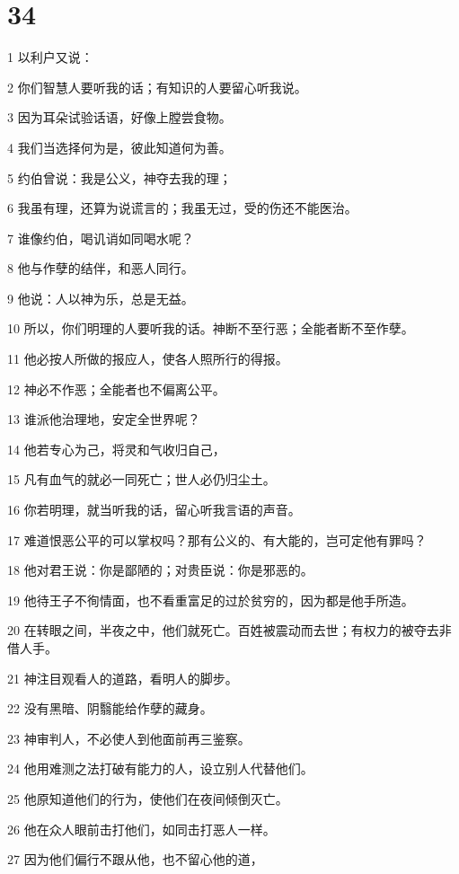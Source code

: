 \chapter{34}

\par 1 以利户又说：
\par 2 你们智慧人要听我的话；有知识的人要留心听我说。
\par 3 因为耳朵试验话语，好像上膛尝食物。
\par 4 我们当选择何为是，彼此知道何为善。
\par 5 约伯曾说：我是公义，神夺去我的理；
\par 6 我虽有理，还算为说谎言的；我虽无过，受的伤还不能医治。
\par 7 谁像约伯，喝讥诮如同喝水呢？
\par 8 他与作孽的结伴，和恶人同行。
\par 9 他说：人以神为乐，总是无益。
\par 10 所以，你们明理的人要听我的话。神断不至行恶；全能者断不至作孽。
\par 11 他必按人所做的报应人，使各人照所行的得报。
\par 12 神必不作恶；全能者也不偏离公平。
\par 13 谁派他治理地，安定全世界呢？
\par 14 他若专心为己，将灵和气收归自己，
\par 15 凡有血气的就必一同死亡；世人必仍归尘土。
\par 16 你若明理，就当听我的话，留心听我言语的声音。
\par 17 难道恨恶公平的可以掌权吗？那有公义的、有大能的，岂可定他有罪吗？
\par 18 他对君王说：你是鄙陋的；对贵臣说：你是邪恶的。
\par 19 他待王子不徇情面，也不看重富足的过於贫穷的，因为都是他手所造。
\par 20 在转眼之间，半夜之中，他们就死亡。百姓被震动而去世；有权力的被夺去非借人手。
\par 21 神注目观看人的道路，看明人的脚步。
\par 22 没有黑暗、阴翳能给作孽的藏身。
\par 23 神审判人，不必使人到他面前再三鉴察。
\par 24 他用难测之法打破有能力的人，设立别人代替他们。
\par 25 他原知道他们的行为，使他们在夜间倾倒灭亡。
\par 26 他在众人眼前击打他们，如同击打恶人一样。
\par 27 因为他们偏行不跟从他，也不留心他的道，
